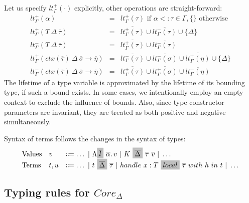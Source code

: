 \documentclass[acmsmall,review,screen]{acmart}
\newcommand{\graybox}[1]{\colorbox{lightgray}{$\displaystyle #1$}}
\newcommand{\vor}{~|~}
\newcommand{\ap}{~}
\newcommand{\ctx}[1]{ctx(#1)~}
\begin{document}
Let us specify $lt_\Gamma^+(\cdot)$ explicitly, other operations are straight-forward:
\[
    \begin{array}{lll}
        lt_\Gamma^+(\alpha) & = & lt_\Gamma^+(\tau) \text{ if } \alpha <: \tau \in \Gamma, \{\} \text{ otherwise} \\
        lt_\Gamma^+(T\ap\Delta\ap\overline{\tau}) & = & \overline{lt_\Gamma^+(\tau)} \cup \overline{lt_\Gamma^-(\tau)} \cup \{\Delta\} \\
        lt_\Gamma^-(T\ap\Delta\ap\overline{\tau}) & = & \overline{lt_\Gamma^+(\tau)} \cup \overline{lt_\Gamma^-(\tau)} \\
        lt_\Gamma^{+}(\ctx{\overline{\tau}}\Delta~\overline{\sigma}\to\overline{\eta}) & = & \overline{lt_\Gamma^{-}(\tau)} \cup \overline{lt_\Gamma^{-}(\sigma)} \cup \overline{lt_\Gamma^{+}(\eta)} \cup \{\Delta\} \\
        lt_\Gamma^{-}(\ctx{\overline{\tau}}\Delta~\overline{\sigma}\to\overline{\eta}) & = & \overline{lt_\Gamma^{+}(\tau)} \cup \overline{lt_\Gamma^{+}(\sigma)} \cup \overline{lt_\Gamma^{-}(\eta)}
    \end{array}
\]
The lifetime of a type variable is approximated by the lifetime of its bounding type, if such a bound exists.
In some cases, we intentionally employ an empty context to exclude the influence of bounds.
Also, since type constructor parameters are invariant, they are treated as both positive and negative simultaneously.

Syntax of terms follows the changes in the syntax of types:
\[
    \begin{array}{lll}
        \text{Values} & v & \Coloneqq \ldots \vor \Lambda \graybox{\overline{l}}\ap\overline{\alpha}\ldotp v \vor K\ap\graybox{\overline{\Delta}}\ap\overline{\tau}\ap\overline{v} \vor \ldots \\
        \text{Terms} & t, u &\Coloneqq \ldots \vor t\ap\graybox{\overline{\Delta}}\ap\overline{\tau} \vor handle ~ x : T \ap\graybox{local}\ap \overline{\tau} ~with ~h~in ~t \vor \ldots
    \end{array}
\]

\subsection{Typing rules for $Core_\Delta$}
\end{document}
